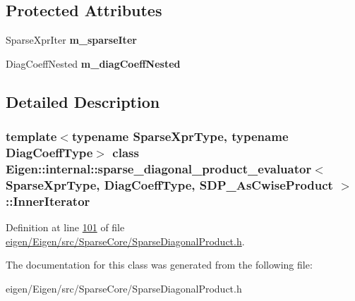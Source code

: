 \subsection*{Protected Attributes}
\begin{DoxyCompactItemize}
\item 
\mbox{\label{class_eigen_1_1internal_1_1sparse__diagonal__product__evaluator_3_01_sparse_xpr_type_00_01_diag_f44167c623880e382ac76ec71f78299c_aa02f9bd53f7501b07ae533a75282385b}} 
Sparse\+Xpr\+Iter {\bfseries m\+\_\+sparse\+Iter}
\item 
\mbox{\label{class_eigen_1_1internal_1_1sparse__diagonal__product__evaluator_3_01_sparse_xpr_type_00_01_diag_f44167c623880e382ac76ec71f78299c_a9c5330655f796c2094d9b3ea933999b1}} 
Diag\+Coeff\+Nested {\bfseries m\+\_\+diag\+Coeff\+Nested}
\end{DoxyCompactItemize}


\subsection{Detailed Description}
\subsubsection*{template$<$typename Sparse\+Xpr\+Type, typename Diag\+Coeff\+Type$>$\newline
class Eigen\+::internal\+::sparse\+\_\+diagonal\+\_\+product\+\_\+evaluator$<$ Sparse\+Xpr\+Type, Diag\+Coeff\+Type, S\+D\+P\+\_\+\+As\+Cwise\+Product $>$\+::\+Inner\+Iterator}



Definition at line \hyperlink{eigen_2_eigen_2src_2_sparse_core_2_sparse_diagonal_product_8h_source_l00101}{101} of file \hyperlink{eigen_2_eigen_2src_2_sparse_core_2_sparse_diagonal_product_8h_source}{eigen/\+Eigen/src/\+Sparse\+Core/\+Sparse\+Diagonal\+Product.\+h}.



The documentation for this class was generated from the following file\+:\begin{DoxyCompactItemize}
\item 
eigen/\+Eigen/src/\+Sparse\+Core/\+Sparse\+Diagonal\+Product.\+h\end{DoxyCompactItemize}
